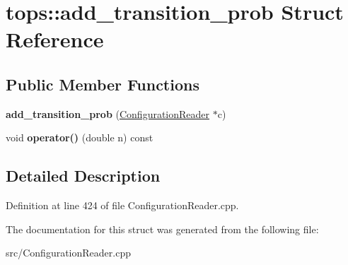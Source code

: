 \hypertarget{structtops_1_1add__transition__prob}{}\section{tops\+:\+:add\+\_\+transition\+\_\+prob Struct Reference}
\label{structtops_1_1add__transition__prob}
\subsection*{Public Member Functions}
\begin{DoxyCompactItemize}
\item 
\mbox{\label{structtops_1_1add__transition__prob_a6188187b78c778ca238df79f156072f0}} 
{\bfseries add\+\_\+transition\+\_\+prob} (\hyperlink{classtops_1_1ConfigurationReader}{Configuration\+Reader} $\ast$c)
\item 
\mbox{\label{structtops_1_1add__transition__prob_a63cdbcf09478b0cd214b0a080ffcfd7c}} 
void {\bfseries operator()} (double n) const
\end{DoxyCompactItemize}


\subsection{Detailed Description}


Definition at line 424 of file Configuration\+Reader.\+cpp.



The documentation for this struct was generated from the following file\+:\begin{DoxyCompactItemize}
\item 
src/Configuration\+Reader.\+cpp\end{DoxyCompactItemize}
